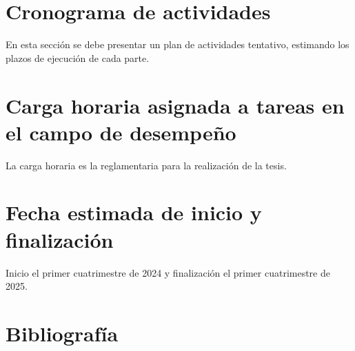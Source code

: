 \documentclass[a4paper,11pt, oneside]{article}
\begin{document}
\section*{Cronograma de actividades}

{
    \color{gray}
    \scriptsize
    En esta sección se debe presentar un plan de actividades tentativo, estimando los plazos de ejecución de cada parte. \\
}



\section*{Carga horaria asignada a tareas en el campo de desempeño}
La carga horaria es la reglamentaria para la realización de la tesis. \\

\section*{Fecha estimada de inicio y finalización}
Inicio el primer cuatrimestre de 2024 y finalización el primer cuatrimestre de 2025. \\

\section*{Bibliografía}
\printbibliography
\end{document}
